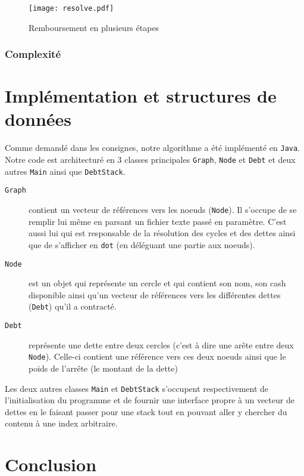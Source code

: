 \documentclass[12pt, oneside]{article}
\begin{document}
\begin{figure}[h]
   \caption{\label{resolve} Remboursement en plusieurs étapes}
   \begin{center}
   \texttt{[image: resolve.pdf]}
   \end{center}
\end{figure}
\subsubsection{Complexité}

\section{Implémentation et structures de données}
Comme demandé dans les consignes, notre algorithme a été implémenté en \texttt{Java}. Notre code est architecturé en 3 classes principales \texttt{Graph}, \texttt{Node} et \texttt{Debt} et deux autres \texttt{Main} ainsi que \texttt{DebtStack}.

\begin{description}
\item[\texttt{Graph}] contient un vecteur de références vers les noeuds (\texttt{Node}). Il s'occupe de se remplir lui même en parsant un fichier texte passé en paramètre. C'est aussi lui qui est responsable de la résolution des cycles et des dettes ainsi que de s'afficher en \texttt{dot} (en déléguant une partie aux noeuds).
\item[\texttt{Node}] est un objet qui représente un cercle et qui contient son nom, son cash disponible ainsi qu'un vecteur de références vers les différentes dettes 
(\texttt{Debt}) qu'il a contracté.
\item[\texttt{Debt}] représente une dette entre deux cercles (c'est à dire une arête entre deux \texttt{Node}). Celle-ci contient une référence vers ces deux noeuds ainsi que le poids de l'arrête (le montant de la dette)
\end{description}
Les deux autres classes \texttt{Main} et \texttt{DebtStack} s'occupent respectivement de l'initialisation du programme et de fournir une interface propre à un vecteur de dettes en le faisant passer pour une stack tout en pouvant aller y chercher du contenu à une index arbitraire.

\section{Conclusion}
\end{document}
